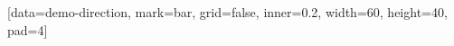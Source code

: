 \documentclass{article}
\begin{document}
\ExplSyntaxOn
\SemioVizProbeOn
\SemioVizChartsDryRun
{}
[data=demo-direction, mark=bar, grid=false, inner=0.2, width=60, height=40, pad=4]
\ExplSyntaxOff
\end{document}
